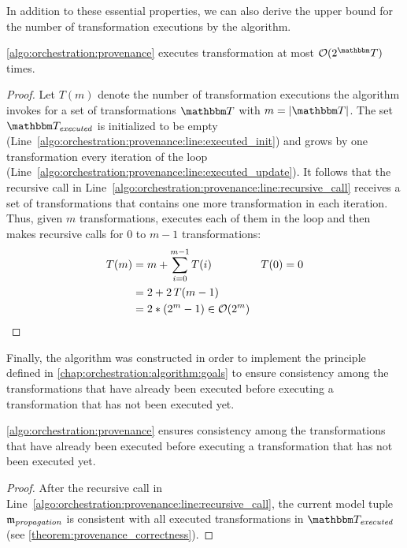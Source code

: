 In addition to these essential properties, we can also derive the upper bound for the number of transformation executions by the algorithm.

\begin{theorem}
    \autoref{algo:orchestration:provenance} executes transformation at most $\mathcal{O}(2^\transformationset{T})$ times.
\end{theorem}
\begin{proof}
	Let $T(m)$ denote the number of transformation executions the algorithm invokes for a set of transformations $\transformationset{T}$ with $m = \abs{\transformationset{T}}$.
	The set $\provalgexecuted$ is initialized to be empty (Line~\ref{algo:orchestration:provenance:line:executed_init}) and grows by one transformation every iteration of the loop (Line~\ref{algo:orchestration:provenance:line:executed_update}).
    It follows that the recursive call in Line~\ref{algo:orchestration:provenance:line:recursive_call} receives a set of transformations that contains one more transformation in each iteration.
    Thus, given $m$ transformations,  executes each of them in the loop and then makes recursive calls for $0$ to $m-1$ transformations:
	\begin{align*}
	T(m)&	=m+\sum_{i=0}^{m-1}T(i)&	T(0)&	=0\\
	&	=2+2\,T(m-1)\\
	&	=2*(2^{m}-1) \in \mathcal{O}(2^m) & & \qedhere
	\end{align*}
\end{proof}

Finally, the algorithm was constructed in order to implement the principle defined in \autoref{chap:orchestration:algorithm:goals} to ensure consistency among the transformations that have already been executed before executing a transformation that has not been executed yet.

\begin{theorem}
    \autoref{algo:orchestration:provenance} ensures consistency among the transformations that have already been executed before executing a transformation that has not been executed yet.
\end{theorem}
\begin{proof}
	After the recursive call in Line~\ref{algo:orchestration:provenance:line:recursive_call}, the current model tuple $\mathfrak{m}_{\mathit{propagation}}$ is consistent with all executed transformations in $\provalgexecuted$ (see \autoref{theorem:provenance_correctness}). %
\end{proof}	

